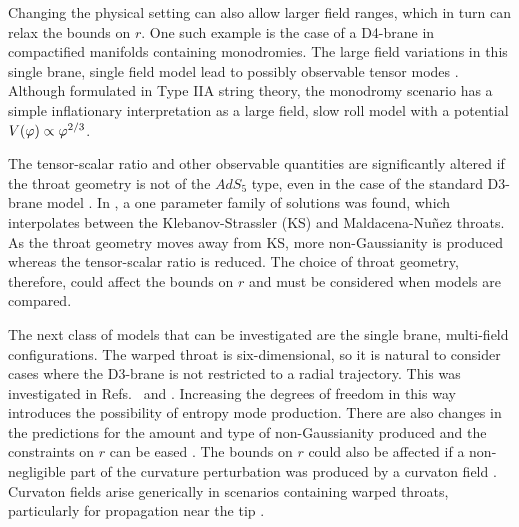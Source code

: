 Changing the physical setting can also allow larger field ranges, which in turn can relax the
bounds on $r$. One such example is the case of a D4-brane in compactified manifolds
containing monodromies. 
The large field variations in this single brane, single field model lead to possibly
observable
tensor modes
\cite{Silverstein:2008sg}. Although formulated in Type IIA string theory, the
monodromy scenario has a simple inflationary interpretation as a large field, slow roll
model with a potential $V(\varphi)\propto\varphi^{2/3}$. 

The tensor-scalar ratio and other observable quantities are
significantly altered if the throat geometry is not of the $AdS_5$ type, even in the case of the
standard D3-brane model \cite{Gmeiner:2007uw}. In
, a one parameter family of solutions was found, which interpolates
between the
Klebanov-Strassler (KS) \cite{ks} and Maldacena-Nu\~{n}ez
\cite{Maldacena:2000yy} throats. As the throat geometry moves away from KS, more
non-Gaussianity is produced whereas the tensor-scalar ratio is reduced.
The choice of throat geometry, therefore, could affect the bounds on $r$
and must be considered when models are compared.



The next class of models that can be investigated are the single brane, multi-field
configurations. 
% 
The warped throat is six-dimensional, so it is natural to consider cases where
the D3-brane is not restricted to a radial trajectory. This was investigated in
Refs.~\cite{spinflation} and \cite{Huang:2007hh}. Increasing the degrees of
freedom in this way introduces the possibility of entropy mode production. There are also
changes in the predictions for the amount and type of non-Gaussianity produced
and the constraints on $r$ can be eased \cite{Arroja:2008yy, Langlois:2009ej,
Langlois:2008qf, Langlois:2008wt, Mizuno:2009mv, Mizuno:2009cv, RenauxPetel:2009sj}.
%
The bounds on $r$ could also be affected if a non-negligible part of the
curvature perturbation was produced by a curvaton field \cite{Lyth:2001nq}.
Curvaton fields arise generically in scenarios containing warped throats,
particularly for propagation near the tip \cite{Li:2008fm, Kobayashi:2009cm}. 
% 
% 

